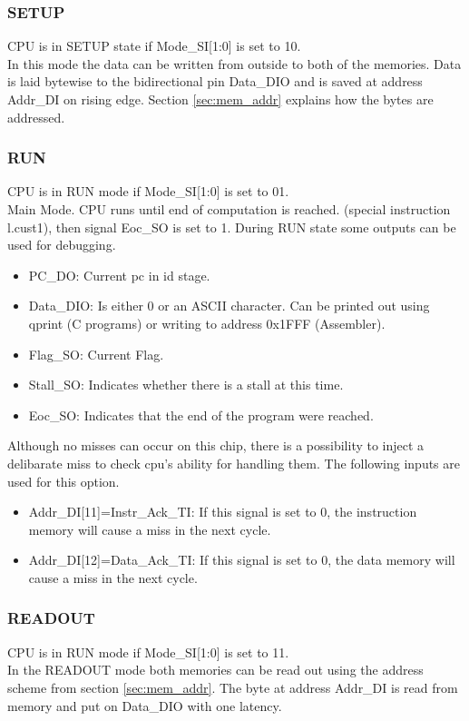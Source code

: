 \subsubsection{SETUP}  
CPU is in SETUP state if Mode\_SI[1:0] is set to 10.\\
In this mode the data can be written from outside to both of the memories. Data is laid bytewise to the bidirectional pin Data\_DIO and is saved at address Addr\_DI on rising edge.  Section \ref{sec:mem_addr} explains how the bytes are addressed.
\subsubsection{RUN}
CPU is in RUN mode if Mode\_SI[1:0] is set to 01.\\
Main Mode. CPU runs until end of computation is reached. (special instruction l.cust1), then signal Eoc\_SO is set to 1. During RUN state some outputs can be used for debugging.
\begin{itemize}
\item PC\_DO: Current \gls{pc} in \gls{id} stage.
\item Data\_DIO: Is either 0 or an ASCII character. Can be printed out using qprint (C programs) or writing to address 0x1FFF (Assembler).
\item Flag\_SO: Current Flag.
\item Stall\_SO: Indicates whether there is a stall at this time. 
\item Eoc\_SO: Indicates that the end of the program were reached.
\end{itemize}

Although no misses can occur on this chip, there is a possibility to inject a delibarate miss to check cpu's ability for handling them. The following inputs are used for this option.
\begin {itemize}
\item Addr\_DI[11]=Instr\_Ack\_TI: If this signal is set to 0, the instruction memory will cause a miss in the next cycle.
\item Addr\_DI[12]=Data\_Ack\_TI: If this signal is set to 0, the data memory will cause a miss in the next cycle.
\end{itemize}

\subsubsection{READOUT}
CPU is in RUN mode if Mode\_SI[1:0] is set to 11.\\
In the READOUT mode both memories can be read out using the address scheme from section \ref{sec:mem_addr}. The byte at address Addr\_DI is read from memory and put on Data\_DIO with one latency. 

